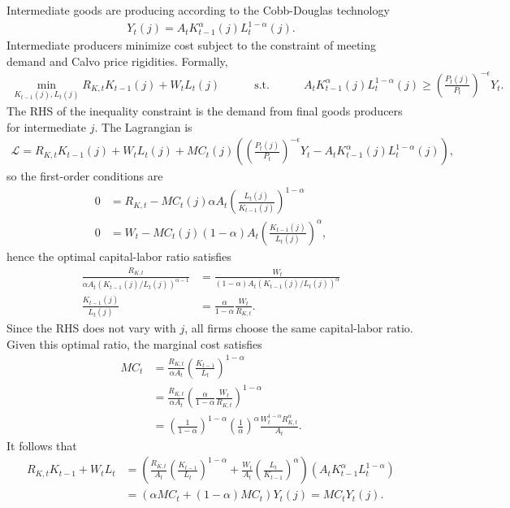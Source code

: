 \documentclass[12 pt, oneside]{article}
\theoremstyle{definition}
\theoremstyle{definition}
\theoremstyle{definition}
\newcommand{\calL}{\mathcal{L}}
\begin{document}
Intermediate goods are producing according to the Cobb-Douglas technology
\begin{align*}
  Y_t(j) = A_t K_{t - 1}^\alpha(j)L_t^{1 - \alpha}(j).
\end{align*}
Intermediate producers minimize cost subject to the constraint of meeting demand and Calvo price rigidities. Formally,
\begin{align*}
  \min_{K_{t - 1}(j), L_t(j)} R_{K, t} K_{t - 1}(j) + W_t L_t(j)\quad\quad\quad\text{s.t.}\quad\quad\quad A_t K_{t - 1}^\alpha(j) L_t^{1 - \alpha}(j) \geq \left(\frac{P_t(j)}{P_t}\right)^{-\epsilon}Y_t.
\end{align*}
The RHS of the inequality constraint is the demand from final goods producers for intermediate $j$. The Lagrangian is
\begin{align*}
  \calL = R_{K, t} K_{t - 1}(j) + W_t L_t(j) + MC_t(j)\left(\left(\frac{P_t(j)}{P_t}\right)^{-\epsilon}Y_t - A_t K_{t - 1}^\alpha(j) L_t^{1 - \alpha}(j)\right),
\end{align*}
so the first-order conditions are
\begin{align*}
  0 & = R_{K, t} - MC_t(j) \alpha A_t \left(\frac{L_t(j)}{K_{t - 1}(j)}\right)^{1 - \alpha}\\
  0 & = W_t - MC_t(j) (1-\alpha) A_t \left(\frac{K_{t - 1}(j)}{L_t(j)}\right)^{\alpha},
\end{align*}
hence the optimal capital-labor ratio satisfies
\begin{align*}
  \frac{R_{K, t}}{\alpha A_t(K_{t - 1}(j)/L_t(j))^{\alpha - 1}} & = \frac{W_t}{(1-\alpha) A_t(K_{t - 1}(j)/L_t(j))^{ \alpha}}\\
  \frac{K_{t - 1}(j)}{L_t(j)} & =\frac{\alpha}{1 - \alpha} \frac{W_t}{R_{K, t}}.
\end{align*}
Since the RHS does not vary with $j$, all firms choose the same capital-labor ratio. Given this optimal ratio, the marginal cost satisfies
\begin{align*}
  MC_t & = \frac{R_{K, t}}{\alpha A_t}\left(\frac{K_{t - 1}}{L_t}\right)^{1 - \alpha}\\
       & =  \frac{R_{K, t}}{\alpha A_t}\left(\frac{\alpha}{1 - \alpha} \frac{W_t}{R_{K, t}}\right)^{1 - \alpha}\\
       & =  \left(\frac{1}{1 - \alpha}\right)^{1 - \alpha}\left(\frac{1}{\alpha}\right)^{\alpha}\frac{W_t^{1 - \alpha}R_{K, t}^{\alpha}}{ A_t}.
\end{align*}
It follows that
\begin{align*}
  R_{K, t}K_{t - 1} + W_tL_t & = \left(\frac{R_{K, t}}{A_t}\left(\frac{K_{t - 1}}{L_t}\right)^{1 - \alpha} + \frac{W_t}{A_t}\left(\frac{L_t}{K_{t - 1}}\right)^{\alpha}\right)(A_tK_{t - 1}^\alpha L_t^{1 - \alpha})\\
                       & = \left(\alpha MC_t + (1 - \alpha)MC_t\right)Y_t(j) = MC_t Y_t(j).
\end{align*}
\end{document}

